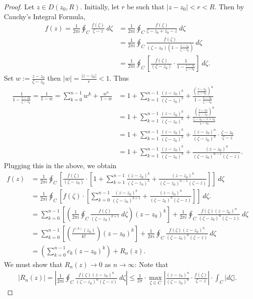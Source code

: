 \documentclass[12pt,openany]{book}
\theoremstyle{definition}
\newcommand{\of}[1]{\left( #1 \right)}
\newcommand{\abs}[1]{\left\lvert #1 \right\rvert}
\begin{document}
	\begin{proof}
		Let $z\in D(z_0,R)$. Initially, let $r$ be such that $\abs{z-z_0}<r<R$. Then by Cauchy's Integral Formula, \begin{align*}
			f(z)=\frac{1}{2\pi i}\oint_C\frac{f\of{\zeta}}{\zeta-z}\ d\zeta&=\frac{1}{2\pi i}\oint_C\frac{f\of{\zeta}}{\zeta-z_0+z_0-z}\ d\zeta\\
			&=\frac{1}{2\pi i}\oint_C\frac{f\of{\zeta}}{\of{\zeta-z_0}\of{\displaystyle 1-\frac{z-z_0}{\zeta-z_0}}}\ d\zeta\\
			&=\frac{1}{2\pi i}\oint_C\left[\frac{f\of{\zeta}}{\of{\zeta-z_0}}\cdot\frac{1}{\displaystyle 1-\frac{z-z_0}{\zeta-z_0}}\right]\ d\zeta.
		\end{align*} Set $w:=\displaystyle\frac{z-z_0}{\zeta-z_0}$ then $\abs{w}=\displaystyle\frac{\abs{z-z_0}}{r}<1$. Thus \begin{align*}
			\frac{1}{\displaystyle 1-\frac{z-z_0}{\zeta-z_0}}=\frac{1}{1-w}=\sum_{k=0}^{n-1}w^k+\frac{w^n}{1-w}
			&=1+\sum_{k=1}^{n-1}\frac{\of{z-z_0}^k}{\of{\zeta-z_0}^k}+\frac{\of{\displaystyle\frac{z-z_0}{\zeta-z_0}}^n}{1-\displaystyle\frac{z-z_0}{\zeta-z_0}}\\
			&=1+\sum_{k=1}^{n-1}\frac{\of{z-z_0}^k}{\of{\zeta-z_0}^k}+\frac{\of{\displaystyle\frac{z-z_0}{\zeta-z_0}}^n}{\displaystyle\frac{\zeta -z_0-z+z_0}{\zeta-z_0}}\\
			&=1+\sum_{k=1}^{n-1}\frac{\of{z-z_0}^k}{\of{\zeta-z_0}^k}+\frac{\of{z-z_0}^n}{\of{\zeta-z_0}^n}\cdot\frac{\zeta-z_0}{\zeta-z}\\
			&=1+\sum_{k=1}^{n-1}\frac{\of{z-z_0}^k}{\of{\zeta-z_0}^k}+\frac{\of{z-z_0}^n}{\of{\zeta-z_0}^{n-1}\of{\zeta-z}}.
		\end{align*}
		Plugging this in the above, we obtain \begin{align*}
			f(z)&=\frac{1}{2\pi i}\oint_C\left[\frac{f\of{\zeta}}{\of{\zeta-z_0}}\cdot\left[1+\sum_{k=1}^{n-1}\frac{\of{z-z_0}^k}{\of{\zeta-z_0}^k}+\frac{\of{z-z_0}^n}{\of{\zeta-z_0}^{n-1}\of{\zeta-z}}\right]\right]\ d\zeta\\
			&=\frac{1}{2\pi i}\oint_C\left[f\of{\zeta}\cdot\left[\sum_{k=0}^{n-1}\frac{\of{z-z_0}^k}{\of{\zeta-z_0}^{k+1}}+\frac{\of{z-z_0}^n}{\of{\zeta-z_0}^n\of{\zeta-z}}\right]\right]\ d\zeta.\\
			&=\sum_{k=0}^{n-1}\left[\of{\frac{1}{2\pi i}\oint_C\frac{f\of{\zeta}}{\of{\zeta-z_0}^{k+1}}\ d\zeta}\of{z-z_0}^k\right]+\frac{1}{2\pi i}\oint_C\frac{f\of{\zeta}\of{z-z_0}^n}{\of{\zeta-z_0}^n\of{\zeta- z}}\ d\zeta\\
			&=\sum_{k=0}^{n-1}\left[\of{\frac{f^{(k)}(z_0)}{k!}}\of{z-z_0}^k\right]+\frac{1}{2\pi i}\oint_C\frac{f\of{\zeta}\of{z-z_0}^n}{\of{\zeta-z_0}^n\of{\zeta- z}}\ d\zeta\\
			&=\of{\sum_{k=0}^{n-1}c_k\of{z-z_0}^k}+R_n(z).
		\end{align*} We must show that $R_n(z)\to 0$ as $n\to\infty$: Note that \begin{align*}
			\abs{R_n(z)}=\abs{\frac{1}{2\pi i}\oint_C\frac{f\of{\zeta}\of{z-z_0}^n}{\of{\zeta-z_0}^n\of{\zeta- z}}\ d\zeta}\leq \frac{1}{2\pi}\cdot\max_{\zeta\in C}\abs{\frac{\of{z-z_0}^n}{\of{\zeta-z_0}^n}\cdot\frac{f\of{\zeta}}{\zeta-z}}\cdot\int_C\abs{d\zeta}.
		\end{align*}
	\end{proof}
\end{document}
